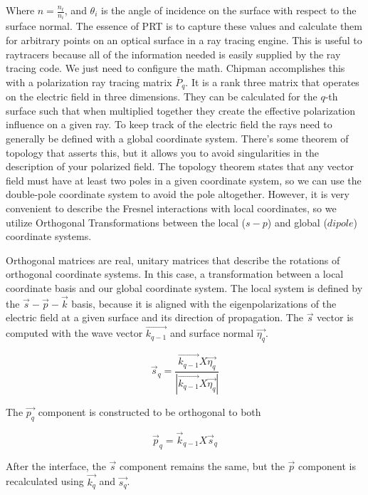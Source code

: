\documentclass{article}
\begin{document}
	Where $n = \frac{n_t}{n_i}$, and $\theta_i$ is the angle of incidence on the surface with respect to the surface normal. The essence of PRT is to capture these values and calculate them for arbitrary points on an optical surface in a ray tracing engine. This is useful to raytracers because all of the information needed is easily supplied by the ray tracing code. We just need to configure the math. Chipman accomplishes this with a polarization ray tracing matrix $\overline{P}_q$. It is a rank three matrix that operates on the electric field in three dimensions. They can be calculated for the $q$-th surface such that when multiplied together they create the effective polarization influence on a given ray. To keep track of the electric field the rays need to generally be defined with a global coordinate system. There's some theorem of topology that asserts this, but it allows you to avoid singularities in the description of your polarized field. The topology theorem states that any vector field must have at least two poles in a given coordinate system, so we can use the double-pole coordinate system to avoid the pole altogether. However, it is very convenient to describe the Fresnel interactions with local coordinates, so we utilize Orthogonal Transformations between the local ($s-p$) and global ($dipole$) coordinate systems.
	
	Orthogonal matrices are real, unitary matrices that describe the rotations of orthogonal coordinate systems. In this case, a transformation between a local coordinate basis and our global coordinate system. The local system is defined by the $\vec{s}-\vec{p}-\vec{k}$ basis, because it is aligned with the eigenpolarizations of the electric field at a given surface and its direction of propagation. The $\vec{s}$ vector is computed with the wave vector $\vec{k_{q-1}}$ and surface normal $\vec{\eta_{q}}$.
	
	\begin{equation}
		\vec{s}_{q} = \frac{\vec{k_{q-1}} X \vec{\eta_{q}}}{|\vec{k_{q-1}} X \vec{\eta_{q}}|}
	\end{equation}

	The $\vec{p_{q}}$ component is constructed to be orthogonal to both
	
	\begin{equation}
		\vec{p}_{q} = \vec{k}_{q-1} X \vec{s}_{q}
	\end{equation}

	After the interface, the $\vec{s}$ component remains the same, but the $\vec{p}$ component is recalculated using $\vec{k_{q}}$ and $\vec{s_q}$. 
	
\end{document}

